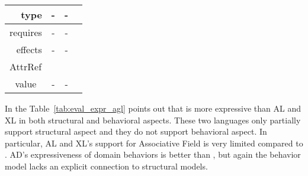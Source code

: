 \begin{minipage}{\textwidth}
\begin{tabular}{|rccl|}
		\multicolumn{1}{|r|}{type}              & \multicolumn{1}{c|}{-}                                                                                             & \multicolumn{1}{c|}{-}                                                                                                 &                               \\ \hline
		\multicolumn{1}{|r|}{requires}          & \multicolumn{1}{c|}{-}                                                                                             & \multicolumn{1}{c|}{-}                                                                                                 &                               \\ \hline
		\multicolumn{1}{|r|}{effects}           & \multicolumn{1}{c|}{-}                                                                                             & \multicolumn{1}{c|}{-}                                                                                                 &                               \\ \hline
		\multicolumn{4}{|l|}{\cellcolor[HTML]{DAE8FC}AttrRef}                                                                                                                                                                                                                                                                 \\ \hline
		\multicolumn{1}{|c|}{value}             & \multicolumn{1}{c|}{-}                                                                                             & \multicolumn{1}{c|}{-}                                                                                                 &                               \\ \hline
	
	\end{tabular}
	
\end{minipage}
	
	In the Table~\ref{tab:eval_expr_agl} points out that \agldcsl is more expressive than AL and XL in both structural and behavioral aspects. These two languages only partially support structural aspect and they do not support behavioral aspect. In particular, AL and XL's support for Associative Field is very limited compared to \agldcsl. AD's expressiveness of domain behaviors is better than \agl, but again the behavior model lacks an explicit connection to structural models.
	

